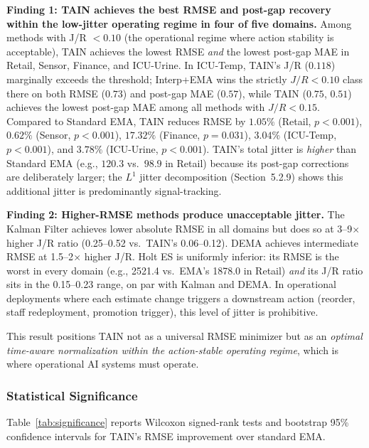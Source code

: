 \documentclass[11pt,a4paper]{article}
\begin{document}
\textbf{Finding 1: TAIN achieves the best RMSE and post-gap recovery within the
low-jitter operating regime in four of five domains.}
Among methods with J/R $< 0.10$ (the operational regime where action stability is
acceptable), TAIN achieves the lowest RMSE \emph{and} the lowest post-gap MAE in
Retail, Sensor, Finance, and ICU-Urine. In ICU-Temp, TAIN's J/R ($0.118$)
marginally exceeds the threshold; Interp+EMA wins the strictly $J/R < 0.10$
class there on both RMSE ($0.73$) and post-gap MAE ($0.57$), while TAIN
($0.75$, $0.51$) achieves the lowest post-gap MAE among all methods with
$J/R < 0.15$. Compared to Standard EMA, TAIN reduces RMSE by $1.05\%$
(Retail, $p < 0.001$), $0.62\%$ (Sensor, $p < 0.001$), $17.32\%$ (Finance,
$p = 0.031$), $3.04\%$ (ICU-Temp, $p < 0.001$), and $3.78\%$ (ICU-Urine,
$p < 0.001$). TAIN's total jitter is \emph{higher} than Standard EMA
(e.g., $120.3$ vs.\ $98.9$ in Retail) because its post-gap corrections are
deliberately larger; the $L^1$ jitter decomposition (Section~5.2.9) shows this
additional jitter is predominantly signal-tracking.

\textbf{Finding 2: Higher-RMSE methods produce unacceptable jitter.}
The Kalman Filter achieves lower absolute RMSE in all domains but does so at
3--9$\times$ higher J/R ratio (0.25--0.52 vs.\ TAIN's 0.06--0.12). DEMA achieves
intermediate RMSE at 1.5--2$\times$ higher J/R. Holt ES is uniformly inferior:
its RMSE is the worst in every domain (e.g., 2521.4 vs.\ EMA's 1878.0 in Retail)
\emph{and} its J/R ratio sits in the 0.15--0.23 range, on par with Kalman and
DEMA. In operational deployments where each estimate change triggers a
downstream action (reorder, staff redeployment, promotion trigger), this level
of jitter is prohibitive.

This result positions TAIN not as a universal RMSE minimizer but as an
\emph{optimal time-aware normalization within the action-stable operating regime},
which is where operational AI systems must operate.

\subsubsection{Statistical Significance}

Table~\ref{tab:significance} reports Wilcoxon signed-rank tests and bootstrap
95\% confidence intervals for TAIN's RMSE improvement over standard EMA.
\end{document}
